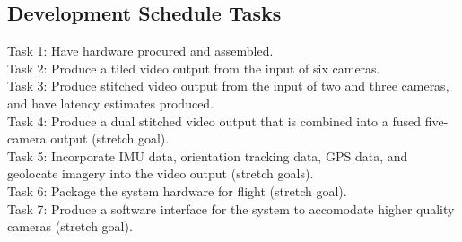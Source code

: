 \documentclass[letterpaper,10pt,serif,draftclsnofoot,onecolumn,compsoc,titlepage]{IEEEtran}
\begin{document}
\subsection{Development Schedule Tasks}
Task 1: Have hardware procured and assembled.\\
Task 2: Produce a tiled video output from the input of six cameras.\\
Task 3: Produce stitched video output from the input of two and three cameras, 
and have latency estimates produced.\\
Task 4: Produce a dual stitched video output that is combined into a fused 
five-camera output (stretch goal).\\
Task 5: Incorporate IMU data, orientation tracking data, GPS data, and 
geolocate imagery into the video output (stretch goals).\\
Task 6: Package the system hardware for flight (stretch goal).\\
Task 7: Produce a software interface for the system to accomodate higher 
quality cameras (stretch goal).\\

\end{document}
